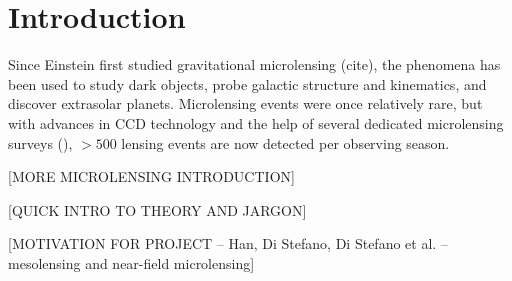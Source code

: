 \documentclass[12pt,preprint]{aastex}
\newcommand{\apwsim}{\raisebox{0.2ex}{\scriptsize$\sim$\normalsize}}
\begin{document}
\begin{abstract}
Many current photometric, time-domain surveys are driven by specific goals, such as supernova searches, transiting exoplanet discoveries, or stellar variability studies, which set the cadence with which individual fields get re-imaged. In the case of the Palomar Transient Factory (PTF), several such sub-surveys are being conducted in parallel, leading to an extremely non-uniform sampling gradient over the survey footprint of nearly 20,000 deg$^2$: while the typical 7.26~deg$^2$ PTF field has been imaged 15 times, \apwsim1000~deg$^2$ of the survey has been observed more than 150 times. We use the existing PTF data to study the trade-off between a large survey footprint and irregular sampling when searching for microlensing events, and to examine the probability that such events can be recovered in these data. We conduct Monte Carlo simulations to evaluate our detection efficiency in a hypothetical survey field as a function of both the baseline and number of observations. We also apply variability statistics to systematically differentiate between periodic, transient, and flat light curves. Preliminary results suggest that both recovery and discovery of microlensing events are possible with a careful consideration of photometric systematics. This work can help inform predictions about the observability of microlensing signals in future wide-field time-domain surveys such as that of LSST.
	
\end{abstract}


\section{Introduction}
Since Einstein first studied gravitational microlensing (cite), the phenomena has been used to study dark objects, probe galactic structure and kinematics, and discover extrasolar planets. Microlensing events were once relatively rare, but with advances in CCD technology and the help of several dedicated microlensing surveys (), $>500$ lensing events are now detected per observing season. 

[MORE MICROLENSING INTRODUCTION]

[QUICK INTRO TO THEORY AND JARGON]

[MOTIVATION FOR PROJECT -- Han, Di Stefano, Di Stefano et al. -- mesolensing and near-field microlensing]
\end{document}
